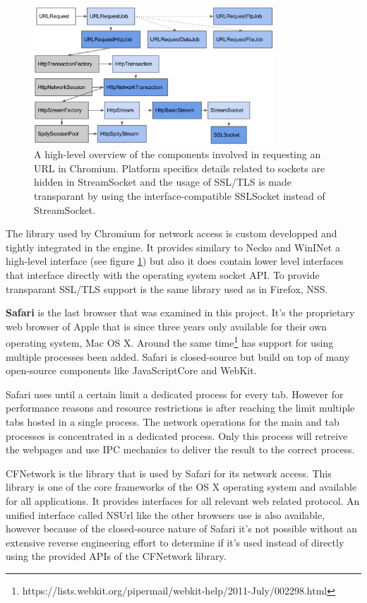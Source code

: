 \begin{figure}[h]
    \centering
    \includegraphics[width=9cm]{Images/Chrome_network.png}
    \caption{A high-level overview of the components involved in requesting an URL in Chromium. Platform specifics details related to sockets are hidden in StreamSocket and the usage of SSL/TLS is made transparant by using the interface-compatible SSLSocket instead of StreamSocket. \cite{http://www.chromium.org/developers/design-documents/network-stack, modified}}
    \label{fig:chrome_network}
\end{figure}

The library used by Chromium for network access is custom developped and tightly integrated in the engine. It provides similary to Necko and WinINet a high-level interface (see figure \ref{fig:chrome_network}) but also it does contain lower level interfaces that interface directly with the operating system socket API. To provide transparant SSL/TLS support is the same library used as in Firefox, NSS.

\textbf{Safari} is the last browser that was examined in this project. It's the proprietary web browser of Apple that is since three years only available for their own operating system, Mac OS X. Around the same time\footnote{https://lists.webkit.org/pipermail/webkit-help/2011-July/002298.html} has support for using multiple processes been added. Safari is closed-source but build on top of many open-source components like JavaScriptCore and WebKit.

Safari uses until a certain limit a dedicated process for every tab. However for performance reasons and resource restrictions is after reaching the limit multiple tabs hosted in a single process. The network operations for the main and tab processes is concentrated in a dedicated process. Only this process will retreive the webpages and use IPC mechanics to deliver the result to the correct process. 

CFNetwork is the library that is used by Safari for its network access. This library is one of the core frameworks of the OS X operating system and available for all applications. It provides interfaces for all relevant web related protocol. An unified interface called NSUrl like the other browsers use is also available, however because of the closed-source nature of Safari it's not possible without an extensive reverse engineering effort to determine if it's used instead of directly using the provided APIs of the CFNetwork library.

